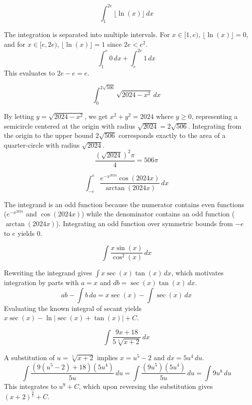 \begin{questions}
    \question \[ \int_{1}^{2e}\lfloor \ln(x)\rfloor \,dx \]
    \begin{solution}
        The integration is separated into multiple intervals. For $x \in [1,e)$, $\lfloor \ln(x)\rfloor=0$, and for $x \in [e,2e)$, $\lfloor \ln(x)\rfloor=1$ since $2e < e^2$.
        \[ \int_{1}^{e} 0 \,dx + \int_{e}^{2e} 1 \,dx \]
        This evaluates to $2e - e = e$.
    \end{solution}

    \question \[ \int_{0}^{2\sqrt{506}}\sqrt{2024-x^{2}} \,dx \]
    \begin{solution}
        By letting $y=\sqrt{2024-x^{2}}$, we get $x^{2}+y^{2}=2024$ where $y \ge 0$, representing a semicircle centered at the origin with radius $\sqrt{2024}=2\sqrt{506}$.
        Integrating from the origin to the upper bound $2\sqrt{506}$ corresponds exactly to the area of a quarter-circle with radius $\sqrt{2024}$.
        \[ \frac{(\sqrt{2024})^{2}\pi}{4} = 506\pi \]
    \end{solution}

    \question \[ \int_{-e}^{e}\frac{e^{-x^{2024}}\cos(2024x)}{\arctan(2024x)} \,dx \]
    \begin{solution}
        The integrand is an odd function because the numerator contains even functions ($e^{-x^{2024}}$ and $\cos(2024x)$) while the denominator contains an odd function ($\arctan(2024x)$).
        Integrating an odd function over symmetric bounds from $-e$ to $e$ yields $0$.
    \end{solution}

    \question \[ \int\frac{x\sin(x)}{\cos^{2}(x)} \,dx \]
    \begin{solution}
        Rewriting the integrand gives $\int x\sec(x)\tan(x) \,dx$, which motivates integration by parts with $a=x$ and $db=\sec(x)\tan(x) \,dx$.
        \[ ab - \int b \,da = x\sec(x) - \int \sec(x) \,dx \]
        Evaluating the known integral of secant yields $x\sec(x) - \ln|\sec(x)+\tan(x)|+C$.
    \end{solution}

    \question \[ \int\frac{9x+18}{5\sqrt[5]{x+2}} \,dx \]
    \begin{solution}
        A substitution of $u=\sqrt[5]{x+2}$ implies $x=u^{5}-2$ and $dx=5u^{4} \,du$.
        \[ \int\frac{(9(u^{5}-2)+18)(5u^{4})}{5u} \,du = \int\frac{(9u^{5})(5u^{4})}{5u} \,du = \int 9u^{8} \,du \]
        This integrates to $u^{9}+C$, which upon reversing the substitution gives $(x+2)^{\frac{9}{5}}+C$.
    \end{solution}


\end{questions}
